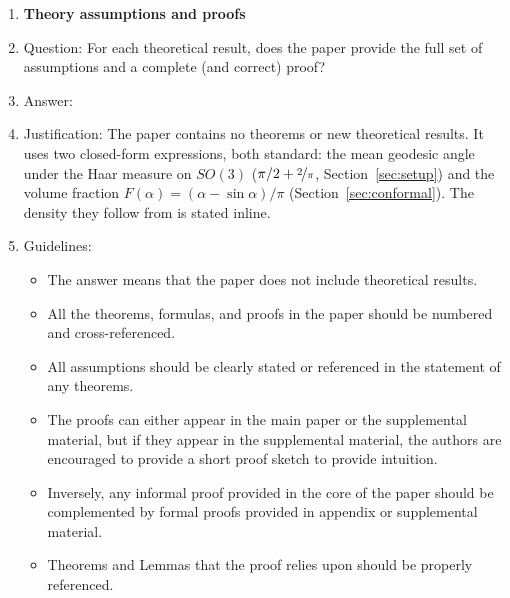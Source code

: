 \begin{enumerate}
\begin{itemize}
        \item The authors should discuss the computational efficiency of the proposed algorithms and how they scale with dataset size.
        \item If applicable, the authors should discuss possible limitations of their approach to address problems of privacy and fairness.
        \item While the authors might fear that complete honesty about limitations might be used by reviewers as grounds for rejection, a worse outcome might be that reviewers discover limitations that aren't acknowledged in the paper. The authors should use their best judgment and recognize that individual actions in favor of transparency play an important role in developing norms that preserve the integrity of the community. Reviewers will be specifically instructed to not penalize honesty concerning limitations.
    \end{itemize}

\item {\bf Theory assumptions and proofs}
    \item[] Question: For each theoretical result, does the paper provide the full set of assumptions and a complete (and correct) proof?
    \item[] Answer: \answerNA{}
    \item[] Justification: The paper contains no theorems or new theoretical results. It uses two
    closed-form expressions, both standard: the mean geodesic angle under the Haar measure
    on $SO(3)$ ($\pi/2 + \nicefrac{2}{\pi}$, Section~\ref{sec:setup}) and the volume
    fraction $F(\alpha) = (\alpha - \sin\alpha)/\pi$ (Section~\ref{sec:conformal}). The
    density they follow from is stated inline.
    \item[] Guidelines:
    \begin{itemize}
        \item The answer \answerNA{} means that the paper does not include theoretical results. 
        \item All the theorems, formulas, and proofs in the paper should be numbered and cross-referenced.
        \item All assumptions should be clearly stated or referenced in the statement of any theorems.
        \item The proofs can either appear in the main paper or the supplemental material, but if they appear in the supplemental material, the authors are encouraged to provide a short proof sketch to provide intuition. 
        \item Inversely, any informal proof provided in the core of the paper should be complemented by formal proofs provided in appendix or supplemental material.
        \item Theorems and Lemmas that the proof relies upon should be properly referenced. 
    \end{itemize}


\end{enumerate}

